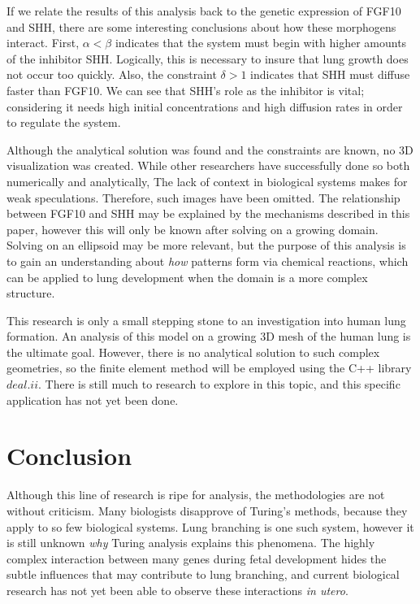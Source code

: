 \documentclass[12pt]{article}
\begin{document}
If we relate the results of this analysis back to the genetic expression of FGF10 and SHH, there are some interesting conclusions about how these morphogens interact. First, $\alpha<\beta$ indicates that the system must begin with higher amounts of the inhibitor SHH. Logically, this is necessary to insure that lung growth does not occur too quickly. Also, the constraint $\delta>1$ indicates that SHH must diffuse faster than FGF10. We can see that SHH's role as the inhibitor is vital; considering it needs high initial concentrations and high diffusion rates in order to regulate the system.
\pagebreak

Although the analytical solution was found and the constraints are known, no 3D visualization was created. While other researchers have successfully done so both numerically and analytically,\cite{Murray2002}\cite{Varea1999}\cite{murphyL} The lack of context in biological systems makes for weak speculations. Therefore, such images have been omitted. The relationship between FGF10 and SHH may be explained by the mechanisms described in this paper, however this will only be known after solving on a growing domain. Solving on an ellipsoid may be more relevant, but the purpose of this analysis is to gain an understanding about \textit{how} patterns form via chemical reactions, which can be applied to lung development when the domain is a more complex structure. 

This research is only a small stepping stone to an investigation into human lung formation. An analysis of this model on a growing 3D mesh of the human lung is the ultimate goal. However, there is no analytical solution to such complex geometries, so the finite element method will be employed using the C++ library $deal.ii$. There is still much to research to explore in this topic, and this specific application has not yet been done.

\section{Conclusion}\label{conclusion}

Although this line of research is ripe for analysis, the methodologies are not without criticism. Many biologists disapprove of Turing's methods, because they apply to so few biological systems. Lung branching is one such system, however it is still unknown \textit{why} Turing analysis explains this phenomena. The highly complex interaction between many genes during fetal development hides the subtle influences that may contribute to lung branching, and current biological research has not yet been able to observe these interactions \textit{in utero}. 
\end{document}
